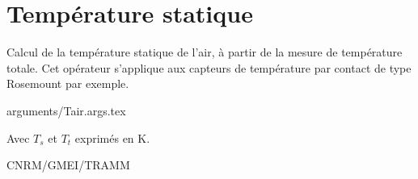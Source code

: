 %
\section{Temp\'erature statique}

 

Calcul de la temp\'erature statique de l'air, \`a 
partir de la mesure de temp\'erature totale.\newline
Cet op\'erateur s'applique aux capteurs de temp\'erature par contact
de type Rosemount par exemple.

\bigskip
 {arguments/Tair.args.tex}




Avec $T_s$ et $T_t$ exprim\'es en K.

CNRM/GMEI/TRAMM


